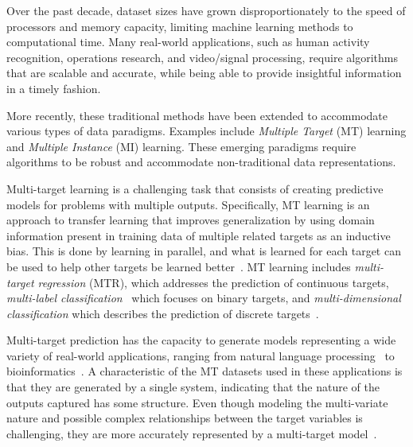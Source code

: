 \documentclass[reqno]{vcuthesis}
\numberwithin{equation}{chapter}
\begin{document}
Over the past decade, dataset sizes have grown disproportionately to the speed of processors and memory capacity, limiting machine learning methods to computational time. Many real-world applications, such as human activity recognition, operations research, and video/signal processing, require algorithms that are scalable and accurate, while being able to provide insightful information in a timely fashion.

More recently, these traditional methods have been extended to accommodate various types of data paradigms. Examples include \textit{Multiple Target} (MT) learning  and \textit{Multiple Instance} (MI) learning. These emerging paradigms require algorithms to be robust and accommodate non-traditional data representations.

Multi-target learning is a challenging task that consists of creating predictive models for problems with multiple outputs. Specifically, MT learning is an approach to transfer learning that improves generalization by using domain information present in training data of multiple related targets as an inductive bias. This is done by learning in parallel, and what is learned for each target can be used to help other targets be learned better~\cite{Baxter1997,Caruana1997,thrun1996learning}. MT learning includes \textit{multi-target regression} (MTR), which addresses the prediction of continuous targets, \textit{multi-label classification}~\cite{Zhang20141819} which focuses on binary targets, and \textit{multi-dimensional classification} which describes the prediction of discrete targets~\cite{Borchani2015}. 

Multi-target prediction has the capacity to generate models representing a wide variety of real-world applications, ranging from natural language processing~\cite{Jeong2009} to bioinformatics~\cite{Lui2010}. A characteristic of the MT datasets used in these applications is that they are generated by a single system, indicating that the nature of the outputs captured has some structure. Even though modeling the multi-variate nature and possible complex relationships between the target variables is challenging, they are more accurately represented by a multi-target model~\cite{Caruana1997,Evgeniou2005}.
\end{document}
